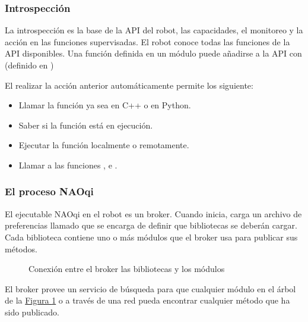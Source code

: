 \subsubsection{Introspección}
\label{\detokenize{chapter_one/naoqi:introspeccion}}
La introspección es la base de la API del robot, las capacidades, el monitoreo
y la acción en las funciones supervisadas. El robot conoce todas las funciones
de la API disponibles. Una función definida en un módulo puede añadirse a la
API con  (definido en )

El realizar la acción anterior automáticamente permite los siguiente:
\begin{itemize}
\item {} 
Llamar la función ya sea en C++ o en Python.

\item {} 
Saber si la función está en ejecución.

\item {} 
Ejecutar la función localmente o remotamente.

\item {} 
Llamar a las funciones ,  e .

\end{itemize}


\subsubsection{El proceso NAOqi}
\label{\detokenize{chapter_one/naoqi:el-proceso-naoqi}}
El ejecutable NAOqi en el robot es un broker.
Cuando inicia, carga un archivo de
preferencias llamado  que se encarga de definir que bibliotecas
se deberán cargar. Cada biblioteca contiene uno o más módulos que el broker usa
para publicar sus métodos.

\begin{figure}[htbp]
\centering
\capstart
\noindent{}
\caption{Conexión entre el broker las bibliotecas y los módulos}\label{\detokenize{chapter_one/naoqi:broker-lib-mod}}\end{figure}

El broker provee un servicio de búsqueda para que cualquier módulo en el árbol
de la \hyperref[\detokenize{chapter_one/naoqi:broker-lib-mod}]{Figura \ref{\detokenize{chapter_one/naoqi:broker-lib-mod}}} o a través de una red pueda encontrar cualquier
método que ha sido publicado.

